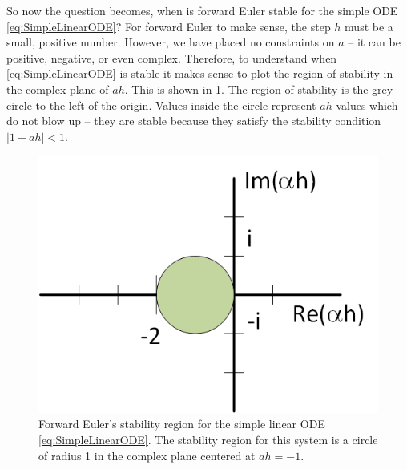 \documentclass[hidelinks,notitlepage]{book}
\begin{document}
So now the question becomes, when is forward Euler stable for the simple ODE \cref{eq:SimpleLinearODE}?  For forward Euler to make sense, the step $h$ must be a small, positive number.  However, we have placed no constraints on $a$ -- it can be positive, negative, or even complex.  Therefore, to understand when \cref{eq:SimpleLinearODE} is stable it makes sense to plot the region of stability in the complex plane of $a h$.  This is shown in \cref{fig:ForwardEulerStabilityRegion}. The region of stability is the grey circle to the left of the origin.  
Values inside the circle represent $a h$ values which do not blow up -- they are stable because they satisfy the stability condition $\lvert 1 + a h \rvert < 1$.  
\begin{figure}[tbh]
	\centering
	\includegraphics[width=0.5\columnwidth]{ForwardEulerStabilityRegion.png}
	\caption{Forward Euler's stability region for the simple linear ODE \cref{eq:SimpleLinearODE}.  The stability region for this system is a circle of radius 1 in the complex plane centered at $a h = -1$.}
	\label{fig:ForwardEulerStabilityRegion}
\end{figure}
\end{document}
